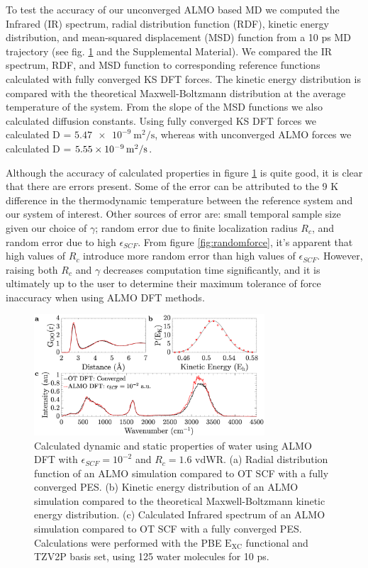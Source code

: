 \documentclass[aps,prl,reprint,amsmath,amssymb]{revtex4-1}
\begin{document}
To test the accuracy of our unconverged ALMO based MD we computed the Infrared (IR) spectrum, radial distribution function (RDF), kinetic energy distribution, and mean-squared displacement (MSD) function from a 10 ps MD trajectory (see fig. \ref{fig:dynproperties} and the Supplemental Material). 
We compared the IR spectrum, RDF, and MSD function to corresponding reference functions calculated with fully converged KS DFT forces.
The kinetic energy distribution is compared with the theoretical Maxwell-Boltzmann distribution at the average temperature of the system.
From the slope of the MSD functions we also calculated diffusion constants.
Using fully converged KS DFT forces we calculated D = $\SI{5.47e-9}{\m^{2}\per\s}$, whereas with unconverged ALMO forces we calculated D = $\SI{5.55E-09}{\m^{2}\per\s}$.

Although the accuracy of calculated properties in figure \ref{fig:dynproperties} is quite good, it is clear that there are errors present.
Some of the error can be attributed to the 9 K difference in the thermodynamic temperature between the reference system and our system of interest.
Other sources of error are: small temporal sample size given our choice of $\gamma$; random error due to finite localization radius $R_{c}$, and random error due to high $\epsilon_{SCF}$.
From figure \ref{fig:randomforce}, it's apparent that high values of $R_{c}$ introduce more random error than high values of $\epsilon_{SCF}$.
However, raising both $R_{c}$ and $\gamma$ decreases computation time significantly, and it is ultimately up to the user to determine their maximum tolerance of force inaccuracy when using ALMO DFT methods.

\begin{figure}
\includegraphics[trim={1.3cm 0.1cm 3.3cm 1.3cm},clip,width=8.6cm]{Dynamical_Data_Tiled.eps}
\caption{\label{fig:dynproperties} Calculated dynamic and static properties of water using ALMO DFT with $\epsilon_{SCF} = 10^{-2}$ and $R_{c} = 1.6$ vdWR.
(a) Radial distribution function of an ALMO simulation compared to OT SCF with a fully converged PES. 
(b) Kinetic energy distribution of an ALMO simulation compared to the theoretical Maxwell-Boltzmann kinetic energy distribution.
(c) Calculated Infrared spectrum of an ALMO simulation compared to OT SCF with a fully converged PES.
Calculations were performed with the PBE $\mathrm{E_{XC}}$ functional and TZV2P basis set, using 125 water molecules for 10 ps.}
\end{figure}
\end{document}
